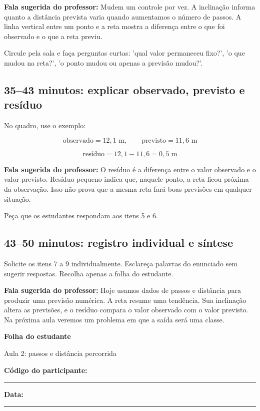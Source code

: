 \documentclass[12pt,a4paper]{article}
\newcommand{\fala}[1]{%
  \noindent\colorbox{cinza}{\parbox{0.96\linewidth}{\textbf{Fala sugerida do professor:} #1}}%
}
\begin{document}
\fala{Mudem um controle por vez. A inclinação informa quanto a distância prevista varia quando aumentamos o número de passos. A linha vertical entre um ponto e a reta mostra a diferença entre o que foi observado e o que a reta previu.}

Circule pela sala e faça perguntas curtas: 'qual valor permaneceu fixo?', 'o que mudou na reta?', 'o ponto mudou ou apenas a previsão mudou?'.

\subsection*{35--43 minutos: explicar observado, previsto e resíduo}

No quadro, use o exemplo:

\[
\text{observado}=12{,}1\text{ m},\qquad
\text{previsto}=11{,}6\text{ m}
\]

\[
\text{resíduo}=12{,}1-11{,}6=0{,}5\text{ m}
\]

\fala{O resíduo é a diferença entre o valor observado e o valor previsto. Resíduo pequeno indica que, naquele ponto, a reta ficou próxima da observação. Isso não prova que a mesma reta fará boas previsões em qualquer situação.}

Peça que os estudantes respondam aos itens 5 e 6.

\subsection*{43--50 minutos: registro individual e síntese}

Solicite os itens 7 a 9 individualmente. Esclareça palavras do enunciado sem sugerir respostas. Recolha apenas a folha do estudante.

\fala{Hoje usamos dados de passos e distância para produzir uma previsão numérica. A reta resume uma tendência. Sua inclinação altera as previsões, e o resíduo compara o valor observado com o valor previsto. Na próxima aula veremos um problema em que a saída será uma classe.}

\newpage

\begin{center}
  {\LARGE\bfseries\color{azul} Folha do estudante}\par
  \vspace{0.15em}
  {\large Aula 2: passos e distância percorrida}\par
\end{center}

\textbf{Código do participante:} \rule{5cm}{0.4pt}
\hfill
\textbf{Data:} \rule{3cm}{0.4pt}
\end{document}
